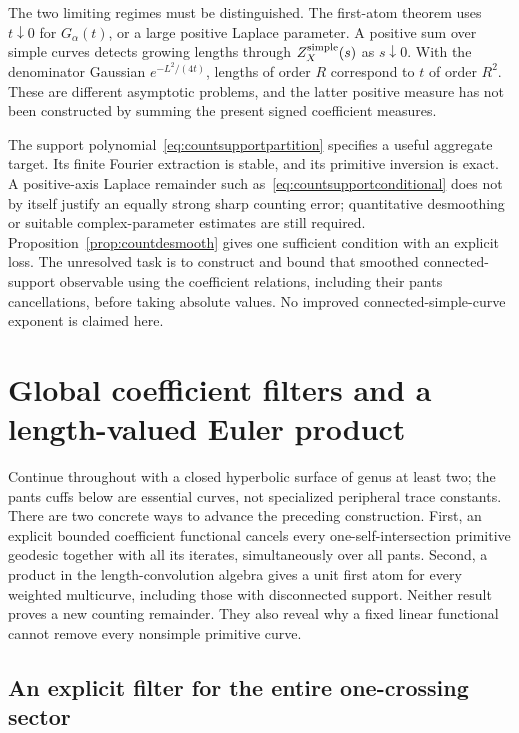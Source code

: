 \documentclass[11pt,a4paper]{article}
\numberwithin{equation}{section}
\theoremstyle{definition}
\theoremstyle{remark}
\begin{document}
The two limiting regimes must be distinguished. The first-atom theorem
uses $t\downarrow0$ for $G_\alpha(t)$, or a large positive Laplace
parameter. A positive sum over simple curves detects growing lengths
through $Z_X^{\rm simple}(s)$ as $s\downarrow0$. With the denominator
Gaussian $e^{-L^2/(4t)}$, lengths of order $R$ correspond to $t$ of
order $R^2$. These are different asymptotic problems, and the latter
positive measure has not been constructed by summing the present signed
coefficient measures.

The support polynomial~\eqref{eq:countsupportpartition} specifies a
useful aggregate target. Its finite Fourier extraction is stable, and
its primitive inversion is exact. A positive-axis Laplace remainder
such as~\eqref{eq:countsupportconditional} does not by itself justify
an equally strong sharp counting error; quantitative desmoothing or
suitable complex-parameter estimates are still required.
Proposition~\ref{prop:countdesmooth} gives one sufficient condition
with an explicit loss. The unresolved task is to construct and bound
that smoothed connected-support observable using the coefficient
relations, including their pants cancellations, before taking absolute
values. No improved connected-simple-curve exponent is claimed here.


\clearpage
\section{Global coefficient filters and a length-valued Euler product}
\label{sec:globalfilters}

Continue throughout with a closed hyperbolic surface of genus at least
two; the pants cuffs below are essential curves, not specialized
peripheral trace constants. There are two concrete ways to advance the
preceding construction.
First, an explicit bounded coefficient functional cancels every
one-self-intersection primitive geodesic together with all its iterates,
simultaneously over all pants. Second, a product in the length-convolution
algebra gives a unit first atom for every weighted multicurve, including
those with disconnected support. Neither result proves a new counting
remainder. They also reveal why a fixed linear functional cannot remove
every nonsimple primitive curve.

\subsection{An explicit filter for the entire one-crossing sector}
\end{document}
